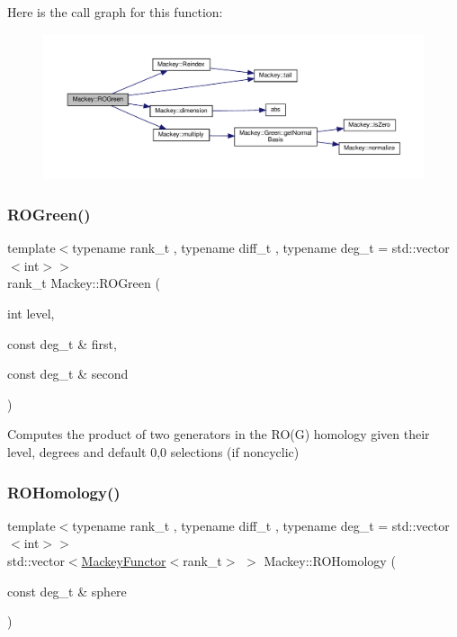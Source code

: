 Here is the call graph for this function\+:\nopagebreak
\begin{figure}[H]
\begin{center}
\leavevmode
\includegraphics[width=350pt]{namespaceMackey_a2bd86833844ca62d76c47a54aeb0bb77_cgraph}
\end{center}
\end{figure}
\mbox{\label{namespaceMackey_a07d3b1e748c6cf2fd8a6e21b948a0afe}} 
\subsubsection{\texorpdfstring{R\+O\+Green()}{ROGreen()}\hspace{0.1cm}{\footnotesize\ttfamily [2/2]}}
{\footnotesize\ttfamily template$<$typename rank\+\_\+t , typename diff\+\_\+t , typename deg\+\_\+t  = std\+::vector$<$int$>$$>$ \\
rank\+\_\+t Mackey\+::\+R\+O\+Green (\begin{DoxyParamCaption}\item[{int}]{level,  }\item[{const deg\+\_\+t \&}]{first,  }\item[{const deg\+\_\+t \&}]{second }\end{DoxyParamCaption})\hspace{0.3cm}{\ttfamily [inline]}}



Computes the product of two generators in the R\+O(\+G) homology given their level, degrees and default 0,0 selections (if noncyclic) 

\mbox{\label{namespaceMackey_a58708ee937b0c4172b7cde8e5f856504}} 
\subsubsection{\texorpdfstring{R\+O\+Homology()}{ROHomology()}}
{\footnotesize\ttfamily template$<$typename rank\+\_\+t , typename diff\+\_\+t , typename deg\+\_\+t  = std\+::vector$<$int$>$$>$ \\
std\+::vector$<$\hyperlink{classMackey_1_1MackeyFunctor}{Mackey\+Functor}$<$rank\+\_\+t$>$ $>$ Mackey\+::\+R\+O\+Homology (\begin{DoxyParamCaption}\item[{const deg\+\_\+t \&}]{sphere }\end{DoxyParamCaption})}



